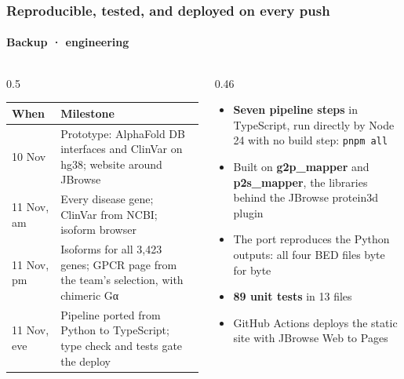 \documentclass[10pt,aspectratio=169]{beamer}
\newcommand{\smallpoints}[1]{\begin{itemize}\footnotesize\setlength{\itemsep}{1.5mm}#1\end{itemize}}
\begin{document}
\begin{frame}
  \frametitle{Reproducible, tested, and deployed on every push}
  \framesubtitle{Backup · engineering}
  \vspace{2mm}
  \begin{columns}[T,onlytextwidth]
    \begin{column}{0.5\textwidth}
      \footnotesize
      \begin{tabular}{@{}l>{\raggedright\arraybackslash}p{44mm}@{}}
        \toprule
        \textbf{When} & \textbf{Milestone} \\
        \midrule
        10 Nov & Prototype: AlphaFold DB interfaces and ClinVar on hg38; website around JBrowse \\[1mm]
        11 Nov, am & Every disease gene; ClinVar from NCBI; isoform browser \\[1mm]
        11 Nov, pm & Isoforms for all 3,423 genes; GPCR page from the team's selection, with chimeric Gα \\[1mm]
        11 Nov, eve & Pipeline ported from Python to TypeScript; type check and tests gate the deploy \\
        \bottomrule
      \end{tabular}
    \end{column}
    \begin{column}{0.46\textwidth}
      \smallpoints{
        \item \textbf{Seven pipeline steps} in TypeScript, run directly by
          Node 24 with no build step: \texttt{pnpm all}
        \item Built on \textbf{g2p\_mapper} and \textbf{p2s\_mapper}, the
          libraries behind the JBrowse protein3d plugin
        \item The port reproduces the Python outputs: all four BED files byte
          for byte
        \item \textbf{89 unit tests} in 13 files
        \item GitHub Actions deploys the static site with JBrowse Web to Pages
      }
    \end{column}
  \end{columns}
\end{frame}
\end{document}
